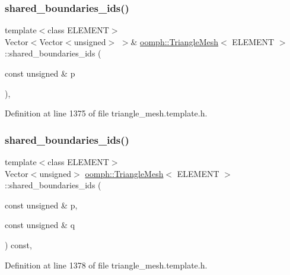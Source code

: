 \subsubsection{\texorpdfstring{shared\+\_\+boundaries\+\_\+ids()}{shared\_boundaries\_ids()}\hspace{0.1cm}{\footnotesize\ttfamily [4/7]}}
{\footnotesize\ttfamily template$<$class E\+L\+E\+M\+E\+NT$>$ \\
Vector$<$Vector$<$unsigned$>$ $>$\& \hyperlink{classoomph_1_1TriangleMesh}{oomph\+::\+Triangle\+Mesh}$<$ E\+L\+E\+M\+E\+NT $>$\+::shared\+\_\+boundaries\+\_\+ids (\begin{DoxyParamCaption}\item[{const unsigned \&}]{p }\end{DoxyParamCaption})\hspace{0.3cm}{\ttfamily [inline]}, {\ttfamily [protected]}}



Definition at line 1375 of file triangle\+\_\+mesh.\+template.\+h.

\mbox{\label{classoomph_1_1TriangleMesh_afefc89a2e4555fa024dd2de1151df160}} 
\subsubsection{\texorpdfstring{shared\+\_\+boundaries\+\_\+ids()}{shared\_boundaries\_ids()}\hspace{0.1cm}{\footnotesize\ttfamily [5/7]}}
{\footnotesize\ttfamily template$<$class E\+L\+E\+M\+E\+NT$>$ \\
Vector$<$unsigned$>$ \hyperlink{classoomph_1_1TriangleMesh}{oomph\+::\+Triangle\+Mesh}$<$ E\+L\+E\+M\+E\+NT $>$\+::shared\+\_\+boundaries\+\_\+ids (\begin{DoxyParamCaption}\item[{const unsigned \&}]{p,  }\item[{const unsigned \&}]{q }\end{DoxyParamCaption}) const\hspace{0.3cm}{\ttfamily [inline]}, {\ttfamily [protected]}}



Definition at line 1378 of file triangle\+\_\+mesh.\+template.\+h.


